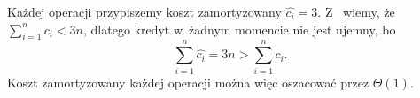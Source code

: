 
\exercise %
\exercise %
Każdej operacji przypiszemy koszt zamortyzowany $\widehat{c_i}=3$.
Z~ wiemy, że $\sum_{i=1}^nc_i<3n$, dlatego kredyt w~żadnym momencie nie jest ujemny, bo
\[
	\sum_{i=1}^n\widehat{c_i} = 3n > \sum_{i=1}^nc_i.
\]
Koszt zamortyzowany każdej operacji można więc oszacować przez $\Theta(1)$.

\exercise %

